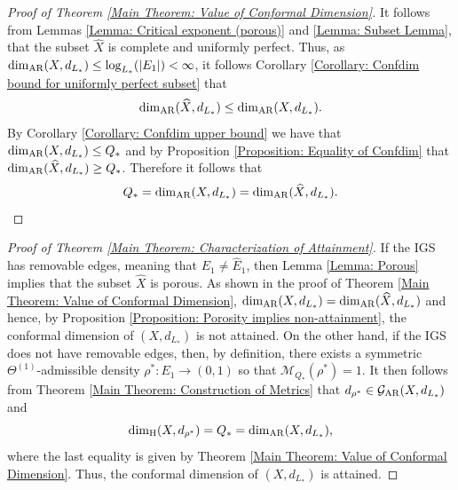 \documentclass{amsart}
\newcommand{\AR}{{\rm AR}}
\numberwithin{equation}{section}
\theoremstyle{definition}
\theoremstyle{remark}
\newcommand{\cG}{\mathcal{G}}
\newcommand{\cM}{\mathcal{M}}
\begin{document}
    \begin{proof}[Proof of Theorem \ref{Main Theorem: Value of Conformal Dimension}]
        It follows from Lemmas \ref{Lemma: Critical exponent (porous)} and \ref{Lemma: Subset Lemma}, that the subset \(\widehat{X}\) is complete and uniformly perfect. Thus, as \(\dim_\AR(X,d_{L_*})\leq \log_{L_*}(\lvert E_1\rvert)<\infty\), it follows Corollary \ref{Corollary: Confdim bound for uniformly perfect subset} that
            \begin{equation}\label{Equation: Confdim inequality}
                \dim_\AR(\widehat{X},d_{L_*})\leq\dim_\AR(X,d_{L_*}).
            \end{equation}
        By Corollary \ref{Corollary: Confdim upper bound} we have that \(\dim_\AR(X,d_{L_*})\leq Q_*\) and by Proposition \ref{Proposition: Equality of Confdim} that \(\dim_\AR(\widehat{X},d_{L_*})\geq Q_*\). Therefore it follows that 
            \[
                Q_*=\dim_\AR(X,d_{L_*})=\dim_\AR(\widehat{X},d_{L_*}).
            \]
    \end{proof}


    \begin{proof}[Proof of Theorem \ref{Main Theorem: Characterization of Attainment}]
        If the IGS has removable edges, meaning that \(E_1\neq \widehat{E}_1\), then Lemma \ref{Lemma: Porous} implies that the subset \(\widehat{X}\) is porous. As shown in the proof of Theorem \ref{Main Theorem: Value of Conformal Dimension}, \(\dim_\AR(X,d_{L_*})=\dim_\AR(\widehat{X},d_{L_*})\) and hence, by Proposition \ref{Proposition: Porosity implies non-attainment}, the conformal dimension of \((X,d_{L_*})\) is not attained. On the other hand, if the IGS does not have removable edges, then, by definition, there exists a symmetric \(\Theta^{(1)}\)-admissible density \(\rho^*\colon E_1\to (0,1)\) so that \(\cM_{Q_*}(\rho^*)=1\). It then follows from Theorem \ref{Main Theorem: Construction of Metrics} that 
        \(d_{\rho^*}\in \cG_\AR(X,d_{L_*})\) and
            \[
                \dim_\mathrm{H}(X,d_{\rho^*})=Q_*=\dim_\AR(X,d_{L_*}),
            \]
        where the last equality is given by Theorem \ref{Main Theorem: Value of Conformal Dimension}. Thus, the conformal dimension of \((X,d_{L_*})\) is attained.
    \end{proof}
    
\end{document}
